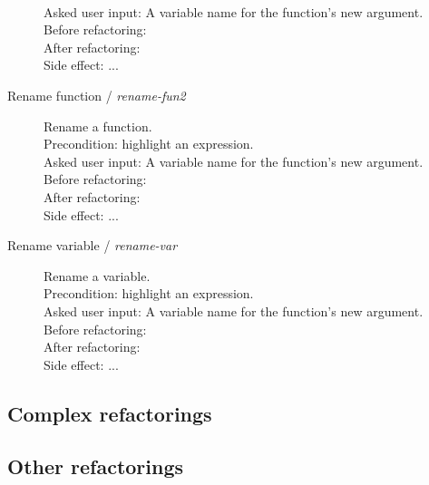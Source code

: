\begin{description}
	\\Asked user input: A variable name for the function's new argument. 
	\\Before refactoring:
	\\After refactoring:
	\\Side effect: ...
	\item[Rename function / \textit{rename-fun2}] Rename a function.
	\\Precondition: highlight an expression.
	\\Asked user input: A variable name for the function's new argument. 
	\\Before refactoring:
	\\After refactoring:
	\\Side effect: ...
	\item[Rename variable / \textit{rename-var}] Rename a variable.
	\\Precondition: highlight an expression.
	\\Asked user input: A variable name for the function's new argument. 
	\\Before refactoring:
	\\After refactoring:
	\\Side effect: ...
\end{description}


\subsection{Complex refactorings}


\subsection{Other refactorings}

